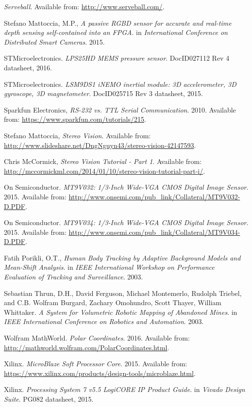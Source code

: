 \begin{thebibliography}{9}
\textit{Serveball}.
Available from: \url{http://www.serveball.com/}.

Stefano Mattoccia, M.P.,
\textit{A passive RGBD sensor for accurate and real-time depth sensing self-contained into an FPGA}.
in \textit{International Conference on Distributed Smart Cameras}. 2015.

STMicroelectronics. \textit{LPS25HD MEMS pressure sensor}. DocID027112 Rev 4 datasheet, 2016.

STMicroelectronics. \textit{LSM9DS1 iNEMO inertial module: 3D accelerometer, 3D gyroscope, 3D magnetometer}. DocID025715 Rev 3 datasheet, 2015.

Sparkfun Electronics, \textit{RS-232 vs. TTL Serial Communication}. 2010. Available from: \url{https://www.sparkfun.com/tutorials/215}.

Stefano Mattoccia, \textit{Stereo Vision}. Available from: \url{http://www.slideshare.net/DngNguyn43/stereo-vision-42147593}.

Chris McCormick, \textit{Stereo Vision Tutorial  - Part 1}. Available from: \url{http://mccormickml.com/2014/01/10/stereo-vision-tutorial-part-i/}.

On Semiconductor. 
\textit{MT9V032: 1/3-Inch Wide-VGA CMOS Digital Image Sensor}. 2015. 
Available from: \url{http://www.onsemi.com/pub_link/Collateral/MT9V032-D.PDF}.

On Semiconductor. 
\textit{MT9V034: 1/3-Inch Wide-VGA CMOS Digital Image Sensor}. 2015. 
Available from: \url{http://www.onsemi.com/pub_link/Collateral/MT9V034-D.PDF}.

Fatih Porikli, O.T.,
\textit{Human Body Tracking by Adaptive Background Models and Mean-Shift Analysis}.
in \textit{IEEE International Workshop on Performance Evaluation of Tracking and Surveillance}. 2003.

Sebastian Thrun, D.H., David Ferguson, Michael Montemerlo, Rudolph Triebel, and C.B. Wolfram Burgard, Zachary Omohundro, Scott Thayer, William Whittaker.
\textit{A System for Volumetric Robotic Mapping of Abandoned Mines}. 
in \textit{IEEE International Conference on Robotics and Automation}. 2003.

Wolfram MathWorld. \textit{Polar Coordinates}. 2016. Available from: \url{http://mathworld.wolfram.com/PolarCoordinates.html}.

Xilinx. \textit{MicroBlaze Soft Processor Core}. 2015. Available from: \url{https://www.xilinx.com/products/design-tools/microblaze.html}.

Xilinx. \textit{Processing System 7 v5.5 LogiCORE IP Product Guide}. in \textit{Vivado Design Suite}. PG082 datasheet, 2015.

\end{thebibliography}

